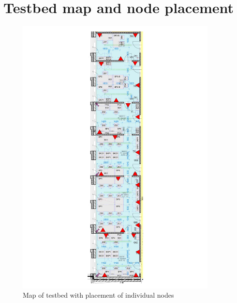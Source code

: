 \documentclass[
  print, %
  Table,   %
  nolof,     %
  nolot,     %
           oneside
]{fithesis3}
\begin{document}
\chapter{Testbed map and node placement}
\begin{figure}[h!!!]
  \includegraphics[width=0.9\textwidth]{../images/testbed.png}
\caption{Map of testbed with placement of individual nodes}
\label{fig:map}
\end{figure}
\end{document}
